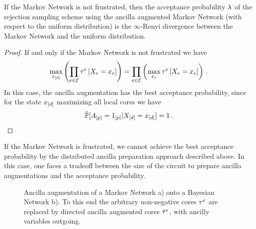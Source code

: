 \begin{lemma} %
    If the Markov Network is not frustrated, then the acceptance probability $\lambda$ of the rejection sampling scheme using the ancilla augmented Markov Network (with respect to the uniform distribution) is the $\infty$-Renyi divergence between the Markov Network and the uniform distribution.
\end{lemma}
\begin{proof}
    If and only if the Markov Network is not frustrated we have
    \begin{align*}
        \max_{x_{[d]}} \left(\prod_{e\in\mathcal{E}}\tau^{e}\left[X_{e}=x_{e}\right]\right)
        = \prod_{e\in\mathcal{E}} \left(\max_{x_{e}} \tau^{e}\left[X_{e}=x_{e}\right]\right) \, .
    \end{align*}
    In this case, the ancilla augmentation has the best acceptance probability, since for the state $x_{[d]}$ maximizing all local cores we have
    \begin{align*}
        \tilde{\mathbb{P}}[A_{[p]}=1_{[p]}|X_{[d]}=x_{[d]}] = 1 \, .
    \end{align*}
\end{proof}

If the Markov Network is frustrated, we cannot achieve the best acceptance probability by the distributed ancilla preparation approach described above.
In this case, one faces a tradeoff between the size of the circuit to prepare ancilla augmentations and the acceptance probability.

\begin{figure}
    \begin{center}
        
    \end{center}
    \caption{Ancilla augmentation of a Markov Network a) onto a Bayesian Network b).
    To this end the arbitrary non-negative cores $\tau^{e}$ are replaced by directed ancilla augmented cores $\tilde{\tau}^{e}$, with ancilly variables outgoing.}
    \label{fig:markovNetworkAugmentation}
\end{figure}

